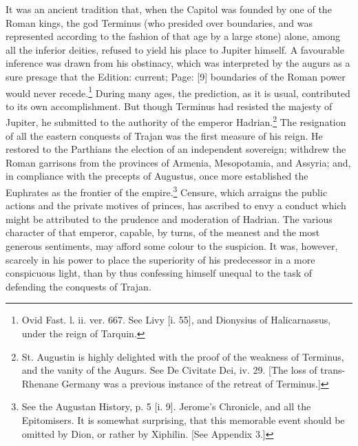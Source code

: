 It was an ancient tradition that, when the Capitol was founded by one of the Roman kings, the god Terminus (who presided over boundaries, and was represented according to the fashion of that age by a large stone) alone, among all the inferior deities, refused to yield his place to Jupiter himself. A favourable inference was drawn from his obstinacy, which was interpreted by the augurs as a sure presage that the Edition: current; Page: [9] boundaries of the Roman power would never recede.\footnote{Ovid Fast. l. ii. ver. 667. See Livy [i. 55], and Dionysius of Halicarnassus, under the reign of Tarquin.} During many ages, the prediction, as it is usual, contributed to its own accomplishment. But though Terminus had resisted the majesty of Jupiter, he submitted to the authority of the emperor Hadrian.\footnote{St. Augustin is highly delighted with the proof of the weakness of Terminus, and the vanity of the Augurs. See De Civitate Dei, iv. 29. [The loss of trans-Rhenane Germany was a previous instance of the retreat of Terminus.]} The resignation of all the eastern conquests of Trajan was the first measure of his reign. He restored to the Parthians the election of an independent sovereign; withdrew the Roman garrisons from the provinces of Armenia, Mesopotamia, and Assyria; and, in compliance with the precepts of Augustus, once more established the Euphrates as the frontier of the empire.\footnote{See the Augustan History, p. 5 [i. 9]. Jerome\texthebrew{}’s Chronicle, and all the Epitomisers. It is somewhat surprising, that this memorable event should be omitted by Dion, or rather by Xiphilin. [See Appendix 3.]} Censure, which arraigns the public actions and the private motives of princes, has ascribed to envy a conduct which might be attributed to the prudence and moderation of Hadrian. The various character of that emperor, capable, by turns, of the meanest and the most generous sentiments, may afford some colour to the suspicion. It was, however, scarcely in his power to place the superiority of his predecessor in a more conspicuous light, than by thus confessing himself unequal to the task of defending the conquests of Trajan.

